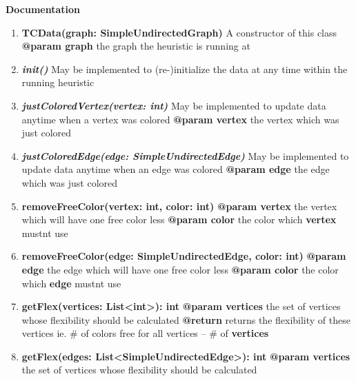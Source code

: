 	\textbf{Documentation}
	
	\begin{enumerate}[\#]
		\item{
			\textbf{TCData(graph: SimpleUndirectedGraph)} \newline
			A constructor of this class \newline
			\textbf{@param graph} the graph the heuristic is running at
		}
		\item{
			\textbf{\textit{init()}} \newline
			May be implemented to (re-)initialize the data at any time within the running heuristic
		}
		\item{
			\textbf{\textit{justColoredVertex(vertex: int)}} \newline
			May be implemented to update data anytime when a vertex was colored \newline
			\textbf{@param vertex} the vertex which was just colored
		}
		\item{
			\textbf{\textit{justColoredEdge(edge: SimpleUndirectedEdge)}} \newline
			May be implemented to update data anytime when an edge was colored \newline
			\textbf{@param edge} the edge which was just colored
		}
		\item{
			\textbf{removeFreeColor(vertex: int, color: int)} \newline
			\textbf{@param vertex} the vertex which will have one free color less \newline
			\textbf{@param color} the color which \textbf{vertex} mustnt use
		}
		\item{
			\textbf{removeFreeColor(edge: SimpleUndirectedEdge, color: int)} \newline
			\textbf{@param edge} the edge which will have one free color less \newline
			\textbf{@param color} the color which \textbf{edge} mustnt use
		}
		\item{
			\textbf{getFlex(vertices: List<int>): int} \newline
			\textbf{@param vertices} the set of vertices whose flexibility should be calculated \newline
			\textbf{@return} returns the flexibility of these vertices ie. \# of colors free for all vertices -- \# of \textbf{vertices}
		}
		\item{
			\textbf{getFlex(edges: List<SimpleUndirectedEdge>): int} \newline
			\textbf{@param vertices} the set of vertices whose flexibility should be calculated \newline
}
\end{enumerate}
